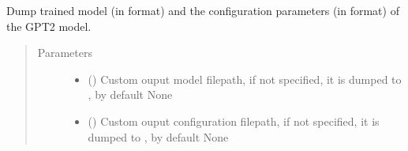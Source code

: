 \documentclass[letterpaper,10pt,english]{sphinxmanual}
\begin{document}
\begin{fulllineitems}
\begin{fulllineitems}
\label{\detokenize{code:gpt2_summarizer_train.TrainGPT2Summarizer.save_trained_model}}
\sphinxAtStartPar
Dump trained model (in  format) and the configuration parameters (in  format)
of the GPT2 model.
\begin{quote}\begin{description}
\item[{Parameters}] \leavevmode\begin{itemize}
\item {} 
\sphinxAtStartPar
{} (\sphinxstyleliteralemphasis{\sphinxupquote{{[}}}\sphinxstyleliteralemphasis{\sphinxupquote{,}}\sphinxstyleliteralemphasis{\sphinxupquote{{]}}}\sphinxstyleliteralemphasis{\sphinxupquote{, }}) \textendash{} Custom ouput model filepath, if not specified, it is dumped to ,
by default None

\item {} 
\sphinxAtStartPar
{} (\sphinxstyleliteralemphasis{\sphinxupquote{{[}}}\sphinxstyleliteralemphasis{\sphinxupquote{,}}\sphinxstyleliteralemphasis{\sphinxupquote{{]}}}\sphinxstyleliteralemphasis{\sphinxupquote{, }}) \textendash{} Custom ouput configuration filepath, if not specified, it is dumped to ,
by default None

\end{itemize}

\end{description}\end{quote}


\end{fulllineitems}
\end{fulllineitems}
\end{document}
